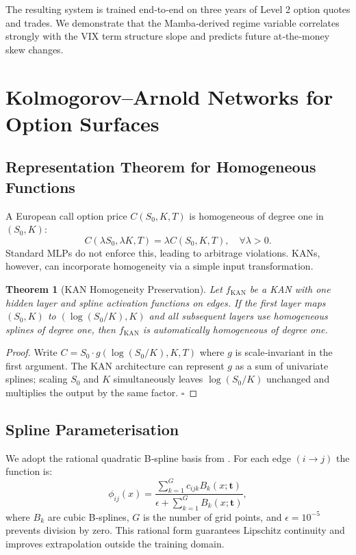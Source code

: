 \documentclass[12pt,a4paper]{article}
\newtheorem{theorem}{Theorem}
\begin{document}
The resulting system is trained end‑to‑end on three years of Level 2 option quotes and trades. We demonstrate that the Mamba‑derived regime variable correlates strongly with the VIX term structure slope and predicts future at‑the‑money skew changes.

\section{Kolmogorov–Arnold Networks for Option Surfaces}

\subsection{Representation Theorem for Homogeneous Functions}

A European call option price $C(S_0,K,T)$ is homogeneous of degree one in $(S_0,K)$:
\begin{equation}
C(\lambda S_0,\lambda K,T) = \lambda C(S_0,K,T), \quad \forall \lambda > 0.
\end{equation}
Standard MLPs do not enforce this, leading to arbitrage violations. KANs, however, can incorporate homogeneity via a simple input transformation.

\begin{theorem}[KAN Homogeneity Preservation]
Let $f_{\text{KAN}}$ be a KAN with one hidden layer and spline activation functions on edges. If the first layer maps $(S_0,K)$ to $(\log(S_0/K), K)$ and all subsequent layers use homogeneous splines of degree one, then $f_{\text{KAN}}$ is automatically homogeneous of degree one.
\end{theorem}

\begin{proof}
Write $C = S_0 \cdot g(\log(S_0/K), K, T)$ where $g$ is scale‑invariant in the first argument. The KAN architecture can represent $g$ as a sum of univariate splines; scaling $S_0$ and $K$ simultaneously leaves $\log(S_0/K)$ unchanged and multiplies the output by the same factor. $\square$
\end{proof}

\subsection{Spline Parameterisation}

We adopt the rational quadratic B‑spline basis from \cite{liu2024kan}. For each edge $(i \to j)$ the function is:
\begin{equation}
\phi_{ij}(x) = \frac{\sum_{k=1}^{G} c_{ijk} B_{k}(x; \mathbf{t})}{\epsilon + \sum_{k=1}^{G} B_{k}(x; \mathbf{t})},
\end{equation}
where $B_k$ are cubic B‑splines, $G$ is the number of grid points, and $\epsilon=10^{-5}$ prevents division by zero. This rational form guarantees Lipschitz continuity and improves extrapolation outside the training domain.
\end{document}
